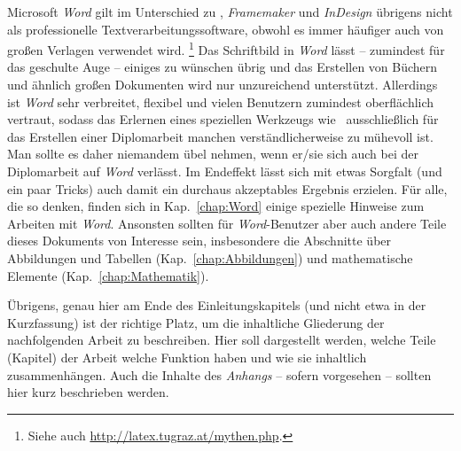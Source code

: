 Microsoft \emph{Word} gilt im Unterschied zu \latex, 
\emph{Framemaker} und \emph{InDesign} übrigens nicht als professionelle
Textverarbeitungssoftware, obwohl es immer häufiger auch von
großen Verlagen verwendet wird.%
\footnote{Siehe auch \url{http://latex.tugraz.at/mythen.php}.}
Das Schriftbild in \emph{Word}
lässt -- zumindest für das geschulte Auge -- einiges zu wünschen
übrig und das Erstellen von Büchern und ähnlich großen Dokumenten
wird nur unzureichend unterstützt. Allerdings ist \emph{Word} sehr
verbreitet, flexibel und vielen Benutzern zumindest oberflächlich
vertraut, sodass das Erlernen eines speziellen Werkzeugs wie
\latex\ ausschließlich für das Erstellen einer Diplomarbeit
manchen verständlicherweise zu mühevoll ist. Man sollte es daher
niemandem übel nehmen, wenn er/sie sich auch bei der Diplomarbeit
auf \emph{Word} verlässt. Im Endeffekt lässt sich mit etwas
Sorgfalt (und ein paar Tricks) auch damit ein durchaus akzeptables
Ergebnis erzielen. Für alle, die so denken, finden sich in
Kap.~\ref{chap:Word} einige spezielle Hinweise zum Arbeiten mit
\emph{Word}. Ansonsten sollten für \emph{Word}-Benutzer aber auch
andere Teile dieses Dokuments von Interesse sein, insbesondere die
Abschnitte über Abbildungen und Tabellen
(Kap.~\ref{chap:Abbildungen}) und mathematische Elemente
(Kap.~\ref{chap:Mathematik}).






Übrigens, genau hier am Ende des Einleitungskapitels (und nicht
etwa in der Kurzfassung) ist der richtige Platz, um die
inhaltliche Gliederung der nachfolgenden Arbeit zu beschreiben.
Hier soll dargestellt werden, welche Teile (Kapitel) der Arbeit
welche Funktion haben und wie sie inhaltlich zusammenhängen. Auch
die Inhalte des \emph{Anhangs} -- sofern vorgesehen -- sollten hier
kurz beschrieben werden.

